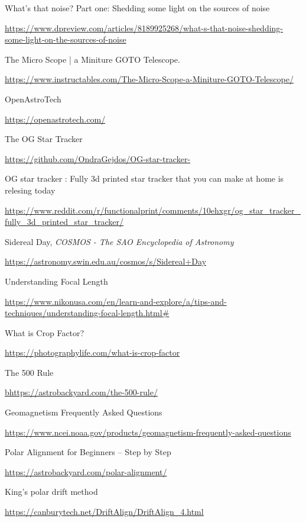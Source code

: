 \documentclass[]{article}
\begin{document}
\begin{thebibliography}{9}
	What's that noise? Part one: Shedding some light on the sources of noise
	
	\url{https://www.dpreview.com/articles/8189925268/what-s-that-noise-shedding-some-light-on-the-sources-of-noise}
	
	The Micro Scope | a Miniture GOTO Telescope.
	
	\url{https://www.instructables.com/The-Micro-Scope-a-Miniture-GOTO-Telescope/}
	
	OpenAstroTech
	
	\url{https://openastrotech.com/}
	
	The OG Star Tracker
	
	\url{https://github.com/OndraGejdos/OG-star-tracker-}
	
	OG star tracker : Fully 3d printed star tracker that you can make at home is relesing today
	
	\url{https://www.reddit.com/r/functionalprint/comments/10ehxgr/og_star_tracker_fully_3d_printed_star_tracker/}
	
	Sidereal Day, \textit{COSMOS - The SAO Encyclopedia of Astronomy}
	
	\url{https://astronomy.swin.edu.au/cosmos/s/Sidereal+Day}
	
	Understanding Focal Length
	
	\url{https://www.nikonusa.com/en/learn-and-explore/a/tips-and-techniques/understanding-focal-length.html#}	
	
	 What is Crop Factor?
	
	\url{https://photographylife.com/what-is-crop-factor}
	
	 The 500 Rule
	
	\url{bhttps://astrobackyard.com/the-500-rule/}
	
	 Geomagnetism Frequently Asked Questions 
	
	\url{https://www.ncei.noaa.gov/products/geomagnetism-frequently-asked-questions}
	
	 Polar Alignment for Beginners – Step by Step
	
	\url{https://astrobackyard.com/polar-alignment/}
	
	 King's polar drift method
	
	\url{https://canburytech.net/DriftAlign/DriftAlign_4.html}
	

\end{thebibliography}
\end{document}
